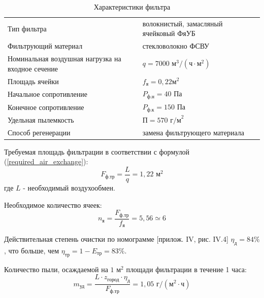 \begin{table}[ht]
    \renewcommand{\tabularxcolumn}[1]{m{#1}}

    \centering
    \begin{tabularx}{\textwidth}{l|L}
        \hline
        Тип фильтра                                         & волокнистый, замасляный ячейковый ФяУБ            \\
        Фильтрующий материал                                & стекловолокно ФСВУ                                \\
        Номинальная воздушная нагрузка на входное сечение   & $q = 7000 \text{ м}^3/(\text{ч} \cdot \text{м}^2)$\\
        Площадь ячейки                                      & $f_\text{я} = 0,22 \text{м}^2 $                   \\
        Начальное сопротивление                             & $P_\text{ф.н} = 40 \text{ Па}$                    \\
        Конечное сопротивление                              & $P_\text{ф.к} = 150 \text{ Па}$                   \\
        Удельная пылемкость                                 & $\text{П} = 570 \text{ г/м}^2$                    \\
        Способ регенерации                                  & замена фильтрующего материала                     \\
        \hline
    \end{tabularx}
    \caption{Характеристики фильтра}
\end{table}

Требуемая площадь фильтрации в соответствии с формулой (\ref{required_air_exchange}):
$$
    F_\text{ф.тр} = \frac{L}{q} = 1,22 \text{ м}^2
$$
где $L$ - необходимый воздухообмен.

Необходимое количество ячеек:
$$
    n_\text{я} =    \frac{F_\text{ф.тр}}{f_\text{я}} = 5,56
                    \simeq 6
$$

Действительная степень очистки по номограмме
\cite{air_ventilation_and_conditioning}[прилож. IV, рис. IV.4] $\eta_\text{д} = 84 \%$, что
больше, чем $\eta_\text{тр} = 1 - E_\text{тр} = 83 \%$.

Количество пыли, осаждаемой на $1 \text{ м}^2$ площади фильтрации в течение 1 часа:
$$
    m_\text{уд} = \frac{L \cdot z_\text{город} \cdot \eta_\text{д}}{F_\text{ф.тр}}
            = 1,05 \text{ г/}(\text{м}^2 \cdot \text{ч})
$$

